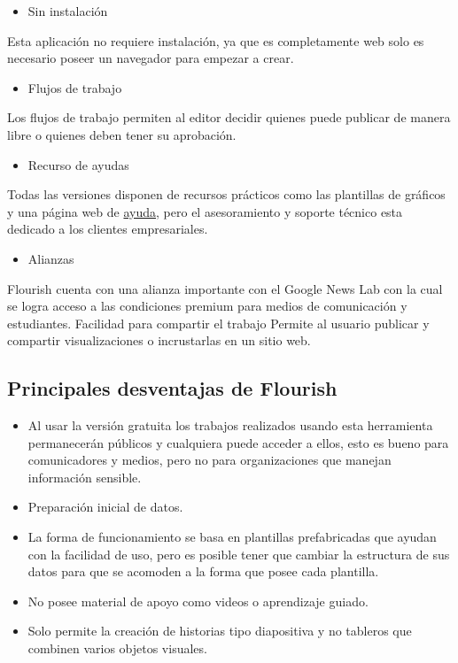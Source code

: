 \documentclass[
]{book}
\providecommand{\tightlist}{%
  \setlength{\itemsep}{0pt}\setlength{\parskip}{0pt}}
\begin{document}
\begin{itemize}
\tightlist
\item
  Sin instalación
\end{itemize}

Esta aplicación no requiere instalación, ya que es completamente web solo es necesario poseer un navegador para empezar a crear.

\begin{itemize}
\tightlist
\item
  Flujos de trabajo
\end{itemize}

Los flujos de trabajo permiten al editor decidir quienes puede publicar de manera libre o quienes deben tener su aprobación.

\begin{itemize}
\tightlist
\item
  Recurso de ayudas
\end{itemize}

Todas las versiones disponen de recursos prácticos como las plantillas de gráficos y una página web de \href{https://help.flourish.studio/}{ayuda}, pero el asesoramiento y soporte técnico esta dedicado a los clientes empresariales.

\begin{itemize}
\tightlist
\item
  Alianzas
\end{itemize}

Flourish cuenta con una alianza importante con el Google News Lab con la cual se logra acceso a las condiciones premium para medios de comunicación y estudiantes.
Facilidad para compartir el trabajo
Permite al usuario publicar y compartir visualizaciones o incrustarlas en un sitio web.

\hypertarget{principales-desventajas-de-flourish}{%
\subsection{Principales desventajas de Flourish}\label{principales-desventajas-de-flourish}}

\begin{itemize}
\item
  Al usar la versión gratuita los trabajos realizados usando esta herramienta permanecerán públicos y cualquiera puede acceder a ellos, esto es bueno para comunicadores y medios, pero no para organizaciones que manejan información sensible.
\item
  Preparación inicial de datos.
\item
  La forma de funcionamiento se basa en plantillas prefabricadas que ayudan con la facilidad de uso, pero es posible tener que cambiar la estructura de sus datos para que se acomoden a la forma que posee cada plantilla.
\item
  No posee material de apoyo como videos o aprendizaje guiado.
\item
  Solo permite la creación de historias tipo diapositiva y no tableros que combinen varios objetos visuales.
\end{itemize}
\end{document}
